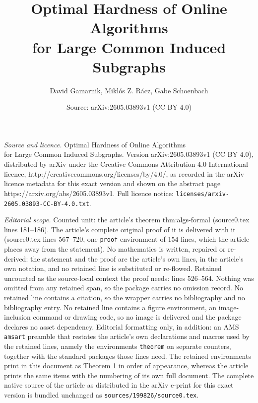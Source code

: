 \documentclass[10pt,a4paper]{amsart}
\title{Optimal Hardness of Online Algorithms\\ for Large Common Induced Subgraphs}
\author{David Gamarnik, Mikl\'os Z. R\'acz, Gabe Schoenbach}
\date{Source: arXiv:2605.03893v1 (CC BY 4.0)}
\begin{document}
\maketitle

\noindent\emph{Source and licence.} Optimal Hardness of Online Algorithms\\ for Large Common Induced Subgraphs. Version arXiv:2605.03893v1 (CC BY 4.0), distributed by arXiv under the Creative Commons Attribution 4.0 International licence, http://creativecommons.org/licenses/by/4.0/, as recorded in the arXiv licence metadata for this exact version and shown on the abstract page https://arxiv.org/abs/2605.03893v1. Full licence notice: \texttt{licenses/arxiv-2605.03893-CC-BY-4.0.txt}.\par\smallskip

\noindent\textit{Editorial scope.} Counted unit: the article's theorem thm:algs-formal (source0.tex lines 181--186). The article's complete original proof of it is delivered with it (source0.tex lines 567--720, one \texttt{proof} environment of 154 lines, which the article places away from the statement). No mathematics is written, repaired or re-derived: the statement and the proof are the article's own lines, in the article's own notation, and no retained line is substituted or re-flowed.  Retained uncounted as the source-local context the proof needs: lines 526--564.  Nothing was omitted from any retained span, so the package carries no omission record.  No retained line contains a citation, so the wrapper carries no bibliography and no bibliography entry.  No retained line contains a figure environment, an image-inclusion command or drawing code, so no image is delivered and the package declares no asset dependency.  Editorial formatting only, in addition: an AMS \texttt{amsart} preamble that restates the article's own declarations and macros used by the retained lines, namely the environments \texttt{theorem} on separate counters, together with the standard packages those lines need.  The retained environments print in this document as Theorem 1 in order of appearance, whereas the article prints the same items with the numbering of its own full document.  The complete native source of the article as distributed in the arXiv e-print for this exact version is bundled unchanged as \texttt{sources/199826/source0.tex}.
\end{document}
